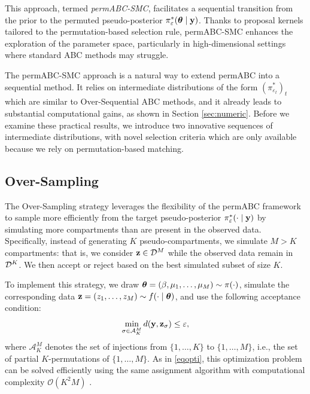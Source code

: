 This approach, termed \emph{permABC-SMC}, facilitates a sequential transition from the prior to the permuted pseudo-posterior \( \pi^*_\varepsilon(\boldsymbol{\theta} \mid \mathbf{y}) \). Thanks to proposal kernels tailored to the permutation-based selection rule, permABC-SMC enhances the exploration of the parameter space, particularly in high-dimensional settings where standard ABC methods may struggle.

The permABC-SMC approach is a natural way to extend permABC into a sequential method. It relies on intermediate distributions of the form $(\pi^*_{\varepsilon_t})_t$ which are similar to Over-Sequential ABC methods, and it already leads to substantial computational gains, as shown in Section \ref{sec:numeric}. Before we examine these practical results, we introduce two innovative sequences of intermediate distributions, with novel selection criteria which are only available because we rely on permutation-based matching.

\subsection{Over-Sampling}
\label{sec:permABC_OS}
The Over-Sampling strategy leverages the flexibility of the permABC framework to sample more efficiently from the target pseudo-posterior \( \pi_\varepsilon^*(\cdot \mid \mathbf{y}) \) by simulating more compartments than are present in the observed data. Specifically, instead of generating \( K \) pseudo-compartments, we simulate \( M > K \) compartments: that is, we consider \( \mathbf{z} \in \mathcal{D}^M \) while the observed data remain in \( \mathcal{D}^K \). We then accept or reject based on the best simulated subset of size $K$.

To implement this strategy, we draw \( \boldsymbol{\theta} = (\beta, \mu_1, \dots, \mu_M) \sim \pi(\cdot) \), simulate the corresponding data \( \mathbf{z} = (z_1, \dots, z_M) \sim f(\cdot \mid \boldsymbol{\theta}) \), and use the following acceptance condition:
\begin{equation}
    \label{eq:os}
    \min_{\sigma \in \mathcal{A}_K^M} d(\mathbf{y}, \mathbf{z}_{\sigma}) \leq \varepsilon,
\end{equation}
where \( \mathcal{A}_K^M \) denotes the set of injections from \( \{1, \dots, K\} \) to \( \{1, \dots, M\} \), i.e., the set of partial \( K \)-permutations of \( \{1, \dots, M\} \). As in \eqref{eqopti}, this optimization problem can be solved efficiently using the same assignment algorithm with computational complexity \( \mathcal{O}(K^2 M) \) \citep{crouseImplementing2DRectangular2016a}.

